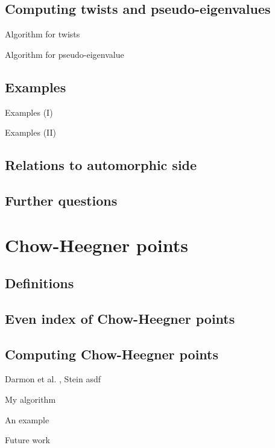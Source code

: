 \documentclass[handout]{beamer}
\begin{document}
\subsection{Computing twists and pseudo-eigenvalues}

\begin{frame}{Algorithm for twists}

\end{frame}

\begin{frame}{Algorithm for pseudo-eigenvalue}

\end{frame}

\subsection{Examples}

\begin{frame}{Examples (I)}

\end{frame}


\begin{frame}{Examples (II)}

\end{frame}

\subsection{Relations to automorphic side}

\subsection{Further questions}



\section{Chow-Heegner points}

\subsection{Definitions}

\subsection{Even index of Chow-Heegner points}

\subsection{Computing Chow-Heegner points}

\begin{frame}{Darmon et al. , Stein}
asdf
\end{frame}

\begin{frame}{My algorithm}

\end{frame}

\begin{frame}{An example}

\end{frame}

\begin{frame}{Future work}

\end{frame}
\end{document}
